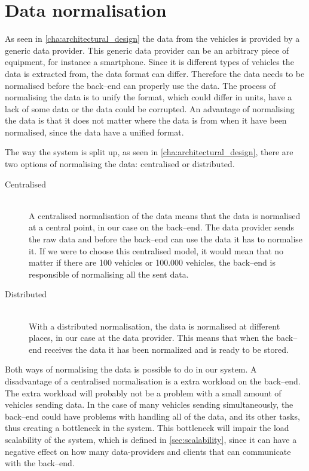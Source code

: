 \section{Data normalisation}\label{sec:data_normalisation}
As seen in \cref{cha:architectural_design} the data from the vehicles is provided by a generic data provider.
This generic data provider can be an arbitrary piece of equipment, for instance a smartphone.
Since it is different types of vehicles the data is extracted from, the data format can differ.
Therefore the data needs to be normalised before the back--end can properly use the data.
The process of normalising the data is to unify the format, which could differ in units, have a lack of some data or the data could be corrupted.
An advantage of normalising the data is that it does not matter where the data is from when it have been normalised, since the data have a unified format.

The way the system is split up, as seen in \cref{cha:architectural_design}, there are two options of normalising the data: centralised or distributed.

\begin{description}
    \item[Centralised] \hfill \\
    A centralised normalisation of the data means that the data is normalised at a central point, in our case on the back--end.
    The data provider sends the raw data and before the back--end can use the data it has to normalise it.
    If we were to choose this centralised model, it would mean that no matter if there are 100 vehicles or 100.000 vehicles,
    the back--end is responsible of normalising all the sent data.

    \item[Distributed] \hfill \\
    With a distributed normalisation, the data is normalised at different places, in our case at the data provider.
    This means that when the back--end receives the data it has been normalized and is ready to be stored.
\end{description}

\bigskip
Both ways of normalising the data is possible to do in our system.
A disadvantage of a centralised normalisation is a extra workload on the back--end.
The extra workload will probably not be a problem with a small amount of vehicles sending data.
In the case of many vehicles sending simultaneously, the back--end could have problems with handling all of the data,
and its other tasks, thus creating a bottleneck in the system.
This bottleneck will impair the load scalability of the system, which is defined in \cref{sec:scalability},
since it can have a negative effect on how many data-providers and clients that can communicate with the back--end.

